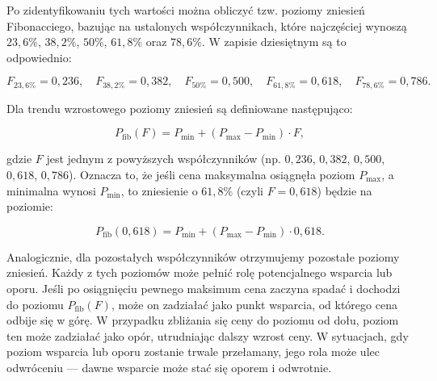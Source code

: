 \documentclass[12pt,a4paper,twoside, inzynierska]{pwr_wmat_praca_dyplomowa}
\theoremstyle{plain}
\numberwithin{theorem}{chapter}
\theoremstyle{definition}
\numberwithin{theorem}{chapter}
\begin{document}
	Po zidentyfikowaniu tych wartości można obliczyć tzw. poziomy zniesień Fibonacciego, bazując na ustalonych współczynnikach, które najczęściej wynoszą \( 23{,}6\% \), \( 38{,}2\% \), \( 50\% \), \( 61{,}8\% \) oraz \( 78{,}6\% \). W zapisie dziesiętnym są to odpowiednio:
	
	\[
	F_{23{,}6\%} = 0{,}236, \quad F_{38{,}2\%} = 0{,}382, \quad F_{50\%} = 0{,}500, \quad F_{61{,}8\%} = 0{,}618, \quad F_{78{,}6\%} = 0{,}786.
	\]
	
	Dla trendu wzrostowego poziomy zniesień są definiowane następująco:
	
	\[
	P_{\text{fib}}(F) = P_{\text{min}} + (P_{\text{max}} - P_{\text{min}}) \cdot F,
	\]
	
	gdzie \( F \) jest jednym z powyższych współczynników (np. \( 0{,}236 \), \( 0{,}382 \), \( 0{,}500 \), \( 0{,}618 \), \( 0{,}786 \)). Oznacza to, że jeśli cena maksymalna osiągnęła poziom \( P_{\text{max}} \), a minimalna wynosi \( P_{\text{min}} \), to zniesienie o \( 61{,}8\% \) (czyli \( F=0{,}618 \)) będzie na poziomie:
	
	\[
	P_{\text{fib}}(0{,}618) = P_{\text{min}} + (P_{\text{max}} - P_{\text{min}}) \cdot 0{,}618.
	\]
	
	Analogicznie, dla pozostałych współczynników otrzymujemy pozostałe poziomy zniesień. Każdy z tych poziomów może pełnić rolę potencjalnego wsparcia lub oporu. Jeśli po osiągnięciu pewnego maksimum cena zaczyna spadać i dochodzi do poziomu \( P_{\text{fib}}(F) \), może on zadziałać jako punkt wsparcia, od którego cena odbije się w górę. W przypadku zbliżania się ceny do poziomu od dołu, poziom ten może zadziałać jako opór, utrudniając dalszy wzrost ceny. W sytuacjach, gdy poziom wsparcia lub oporu zostanie trwale przełamany, jego rola może ulec odwróceniu — dawne wsparcie może stać się oporem i odwrotnie.
\end{document}
